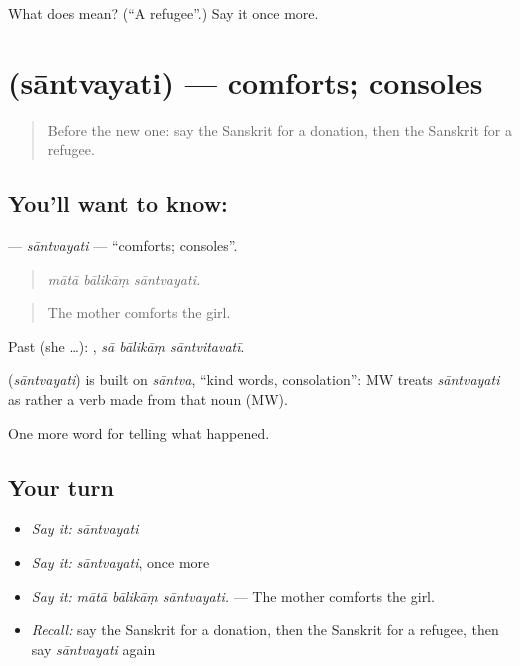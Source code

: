 \begin{tcolorbox}[breakable,colback=teal!4,colframe=teal!35!black,title={Before you move on}]
What does  mean? (\textquotedblleft{}A refugee\textquotedblright{}.) Say it once more.
\end{tcolorbox}
\section[\texorpdfstring{\sk{सान्त्वयति} (sāntvayati)}{सान्त्वयति (sāntvayati)}]{ (sāntvayati) — comforts; consoles}

\label{lesson:SA-C306-santvayati}



\begin{quote}
Before the new one: say the Sanskrit for a donation, then the Sanskrit for a refugee.
\end{quote}

\subsection*{You'll want to know: }
\textbf{} — \emph{sāntvayati} — \textquotedblleft{}comforts; consoles\textquotedblright{}.

\begin{quote}
  
\end{quote}

\begin{quote}
\emph{mātā bālikāṃ sāntvayati.}
\end{quote}

\begin{quote}
The mother comforts the girl.
\end{quote}

Past (she …):   , \emph{sā bālikāṃ sāntvitavatī}.

\begin{cousinweb}
\textbf{} (\emph{sāntvayati}) is built on \emph{sāntva}, \textquotedblleft{}kind words, consolation\textquotedblright{}: MW treats \emph{sāntvayati} as rather a verb made from that noun (MW).
\end{cousinweb}

\begin{grammarlens}[title={What you've built}]
One more word for telling what happened.
\end{grammarlens}

\subsection*{Your turn}
\begin{itemize}
\raggedright
  \item \emph{Say it:} \emph{sāntvayati}
  \item \emph{Say it:} \emph{sāntvayati}, once more
  \item \emph{Say it:} \emph{mātā bālikāṃ sāntvayati.} — The mother comforts the girl.
  \item \emph{Recall:} say the Sanskrit for a donation, then the Sanskrit for a refugee, then say \emph{sāntvayati} again
\end{itemize}


